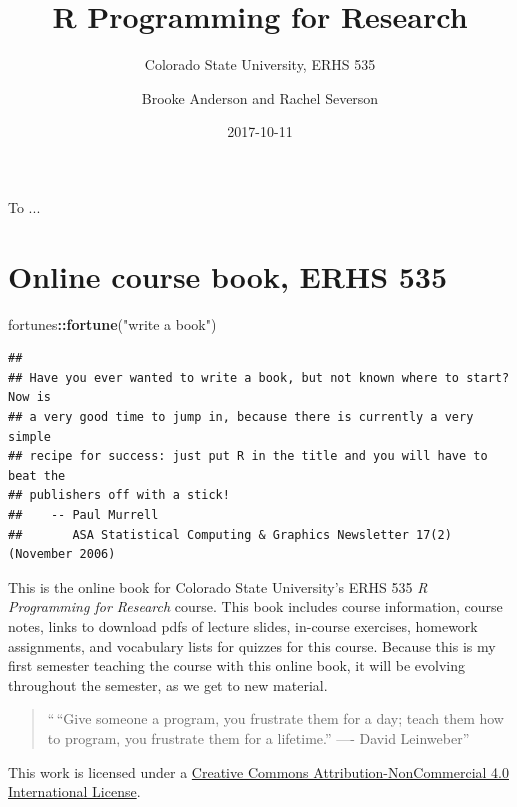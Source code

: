 \documentclass[]{book}
\title{R Programming for Research}
\subtitle{Colorado State University, ERHS 535}
\author{Brooke Anderson and Rachel Severson}
\date{2017-10-11}
\makeatletter
\newenvironment{Shaded}{\begin{snugshade}}{\end{snugshade}}
\newcommand{\KeywordTok}[1]{\textcolor[rgb]{0.13,0.29,0.53}{\textbf{#1}}}
\newcommand{\StringTok}[1]{\textcolor[rgb]{0.31,0.60,0.02}{#1}}
\newcommand{\OperatorTok}[1]{\textcolor[rgb]{0.81,0.36,0.00}{\textbf{#1}}}
\newcommand{\NormalTok}[1]{#1}
\newenvironment{kframe}{%
\medskip{}
\setlength{\fboxsep}{.8em}
 \def\at@end@of@kframe{}%
 \ifinner\ifhmode%
  \def\at@end@of@kframe{\end{minipage}}%
  \begin{minipage}{\columnwidth}%
 \fi\fi%
 \def\FrameCommand##1{\hskip\@totalleftmargin \hskip-\fboxsep
 \colorbox{shadecolor}{##1}\hskip-\fboxsep
     \hskip-\linewidth \hskip-\@totalleftmargin \hskip\columnwidth}%
 \MakeFramed {\advance\hsize-\width
   \@totalleftmargin\z@ \linewidth\hsize
   \@setminipage}}%
 {\par\unskip\endMakeFramed%
 \at@end@of@kframe}
\renewenvironment{Shaded}{\begin{kframe}}{\end{kframe}}
\theoremstyle{definition}
\theoremstyle{definition}
\theoremstyle{definition}
\theoremstyle{remark}
\makeatother
\begin{document}
\maketitle

\cleardoublepage\newpage\thispagestyle{empty}\null
\cleardoublepage\newpage\thispagestyle{empty}
\begin{center}
To ...
\end{center}

\frontmatter

{
\setcounter{tocdepth}{1}
\tableofcontents
}
\chapter*{Online course book, ERHS
535}\label{online-course-book-erhs-535}

\begin{Shaded}
\begin{Highlighting}[]
\NormalTok{fortunes}\OperatorTok{::}\KeywordTok{fortune}\NormalTok{(}\StringTok{"write a book"}\NormalTok{)}
\end{Highlighting}
\end{Shaded}

\begin{verbatim}
## 
## Have you ever wanted to write a book, but not known where to start? Now is
## a very good time to jump in, because there is currently a very simple
## recipe for success: just put R in the title and you will have to beat the
## publishers off with a stick!
##    -- Paul Murrell
##       ASA Statistical Computing & Graphics Newsletter 17(2) (November 2006)
\end{verbatim}

This is the online book for Colorado State University's ERHS 535 \emph{R
Programming for Research} course. This book includes course information,
course notes, links to download pdfs of lecture slides, in-course
exercises, homework assignments, and vocabulary lists for quizzes for
this course. Because this is my first semester teaching the course with
this online book, it will be evolving throughout the semester, as we get
to new material.

\begin{quote}
``\,``Give someone a program, you frustrate them for a day; teach them
how to program, you frustrate them for a lifetime.'' ---- David
Leinweber''
\end{quote}

This work is licensed under a
\href{https://creativecommons.org/licenses/by-nc/4.0/}{Creative Commons
Attribution-NonCommercial 4.0 International License}.
\end{document}
